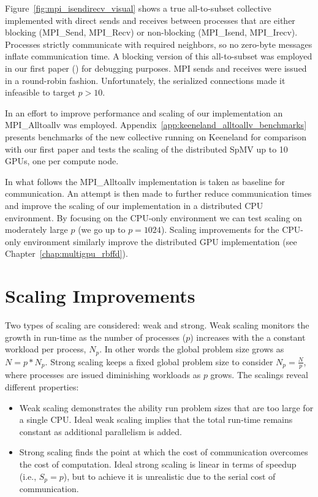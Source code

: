 \documentclass{report}
\begin{document}
Figure~\ref{fig:mpi_isendirecv_visual} shows a true all-to-subset collective implemented with direct sends and receives between processes that are either blocking (MPI\_Send, MPI\_Recv) or non-blocking (MPI\_Isend, MPI\_Irecv). Processes strictly communicate with required neighbors, so no zero-byte messages inflate communication time. 
A blocking version of this all-to-subset was employed in our first paper (\cite{BolligFlyerErlebacher2012}) for debugging purposes. MPI sends and receives were issued in a round-robin fashion. Unfortunately, the serialized connections made it infeasible to target $p > 10$. 

In an effort to improve performance and scaling of our implementation an MPI\_Alltoallv was employed. Appendix~\ref{app:keeneland_alltoallv_benchmarks} presents benchmarks of the new collective running on Keeneland for comparison with our first paper and tests the scaling of the distributed SpMV up to 10 GPUs, one per compute node. 

In what follows the MPI\_Alltoallv implementation is taken as baseline for communication. An attempt is then made to further reduce communication times and improve the scaling of our implementation in a distributed CPU environment. By focusing on the CPU-only environment we can test scaling on moderately large $p$ (we go up to $p = 1024$). Scaling improvements for the CPU-only environment similarly improve the distributed GPU implementation (see Chapter~\ref{chap:multigpu_rbffd}). 

\section{Scaling Improvements} 
\label{sec:cpu_scaling}


Two types of scaling are considered: weak and strong. Weak scaling monitors the growth in run-time as the number of processes ($p$) increases with the a constant workload per process, $N_p$. In other words the global problem size grows as $N = p*N_p$. Strong scaling keeps a fixed global problem size to consider $N_p = \frac{N}{p}$, where processes are issued diminishing workloads as $p$ grows. 
The scalings reveal different properties:
\begin{itemize} 
\item Weak scaling demonstrates the ability run problem sizes that are too large for a single CPU. Ideal weak scaling implies that the total run-time remains constant as additional parallelism is added. %
\item Strong scaling finds the point at which the cost of communication overcomes the cost of computation. Ideal strong scaling is linear in terms of speedup (i.e., $S_p = p$), but to achieve it is unrealistic due to the serial cost of communication. 
\end{itemize}
 
\end{document}
